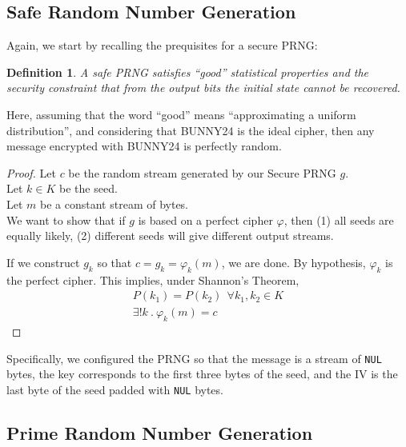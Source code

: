 \documentclass[10pt,a4paper]{report}
\newcommand{\code}[1]{\texttt{#1}}
\begin{document}
\subsection{Safe Random Number Generation}

Again, we start by recalling the prequisites for a secure PRNG:

\newtheorem*{SPRNG}{Definition}
\begin{SPRNG}
  A safe PRNG satisfies ``good'' statistical properties and the security
  constraint that from the output bits the initial state cannot be recovered.
\end{SPRNG}

Here, assuming that the word ``good'' means ``approximating a uniform
distribution'', and considering that BUNNY24 is the ideal cipher, then any
message encrypted with BUNNY24 is perfectly random.

\begin{proof}

Let $c$ be the random stream generated by our Secure PRNG $g$.\\
Let $k \in K$ be the seed. \\
Let $m$ be a constant stream of bytes. \\
We want to show that if $g$ is based on a perfect cipher $\varphi$, then
(1) all seeds are equally likely,
(2) different seeds will give different output streams.

If we construct $g_k$ so that $c = g_k = \varphi_k(m)$, we are done. By
hypothesis, $\varphi_k$ is the perfect cipher. This implies, under Shannon's
Theorem,
\begin{align}
P(k_1) = P(k_2) \ \ \forall k_1, k_2 \in K   \\
\exists!k\ .\ \varphi_k(m) = c
\end{align}



\end{proof}

Specifically, we configured the PRNG so that the message is a stream of
\code{NUL} bytes, the key corresponds to the first three bytes of the seed, and
the IV is the last byte of the seed padded with \code{NUL} bytes.

\subsection{Prime Random Number Generation}
\end{document}
